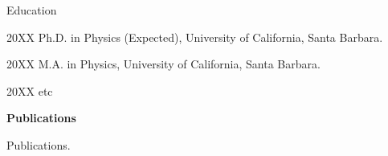 \begin{vitae}

\begin{vitaesection}{Education}
\vspace{-0.1cm}
\item [20XX]	Ph.D. in Physics (Expected), University of California, Santa Barbara.
\item [20XX]	M.A. in Physics, University of California, Santa Barbara.
\item [20XX]	etc
\end{vitaesection}

\textbf{Publications}

Publications.

\end{vitae}